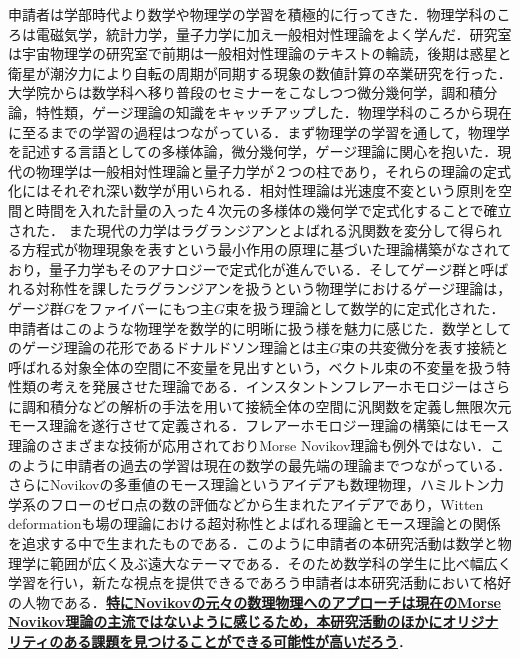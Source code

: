 \documentclass[11pt,a4j,dvipdfmx]{jarticle} 					%
\newcommand{\研究課題名}{象の卵}
\newcommand{\研究機関名}{京都大学}
\newcommand{\研究代表者氏名}{福士謙二}
\begin{document}
\noindent
{}




申請者は学部時代より数学や物理学の学習を積極的に行ってきた．物理学科のころは電磁気学，統計力学，量子力学に加え一般相対性理論をよく学んだ．研究室は宇宙物理学の研究室で前期は一般相対性理論のテキストの輪読，後期は惑星と衛星が潮汐力により自転の周期が同期する現象の数値計算の卒業研究を行った．大学院からは数学科へ移り普段のセミナーをこなしつつ微分幾何学，調和積分論，特性類，ゲージ理論の知識をキャッチアップした．物理学科のころから現在に至るまでの学習の過程はつながっている．まず物理学の学習を通して，物理学を記述する言語としての多様体論，微分幾何学，ゲージ理論に関心を抱いた．現代の物理学は一般相対性理論と量子力学が２つの柱であり，それらの理論の定式化にはそれぞれ深い数学が用いられる．相対性理論は光速度不変という原則を空間と時間を入れた計量の入った４次元の多様体の幾何学で定式化することで確立された．
また現代の力学はラグランジアンとよばれる汎関数を変分して得られる方程式が物理現象を表すという最小作用の原理に基づいた理論構築がなされており，量子力学もそのアナロジーで定式化が進んでいる．そしてゲージ群と呼ばれる対称性を課したラグランジアンを扱うという物理学におけるゲージ理論は，ゲージ群$G$をファイバーにもつ主$G$束を扱う理論として数学的に定式化された．申請者はこのような物理学を数学的に明晰に扱う様を魅力に感じた．数学としてのゲージ理論の花形であるドナルドソン理論とは主$G$束の共変微分を表す接続と呼ばれる対象全体の空間に不変量を見出すという，ベクトル束の不変量を扱う特性類の考えを発展させた理論である．インスタントンフレアーホモロジーはさらに調和積分などの解析の手法を用いて接続全体の空間に汎関数を定義し無限次元モース理論を遂行させて定義される．フレアーホモロジー理論の構築にはモース理論のさまざまな技術が応用されておりMorse Novikov理論も例外ではない．このように申請者の過去の学習は現在の数学の最先端の理論までつながっている．
さらにNovikovの多重値のモース理論というアイデアも数理物理，ハミルトン力学系のフローのゼロ点の数の評価などから生まれたアイデアであり，Witten deformationも場の理論における超対称性とよばれる理論とモース理論との関係を追求する中で生まれたものである．このように申請者の本研究活動は数学と物理学に範囲が広く及ぶ遠大なテーマである．そのため数学科の学生に比べ幅広く学習を行い，新たな視点を提供できるであろう申請者は本研究活動において格好の人物である．\textbf{\ul{特にNovikovの元々の数理物理へのアプローチは現在のMorse Novikov理論の主流ではないように感じるため，本研究活動のほかにオリジナリティのある課題を見つけることができる可能性が高いだろう}}．


\noindent
{}
\end{document}
